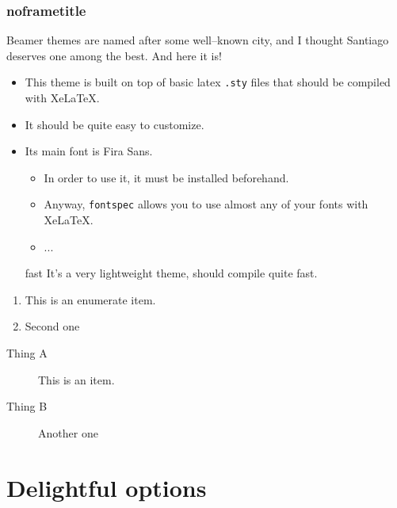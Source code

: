 \documentclass[aspectratio=169]{beamer}
\begin{document}
\begin{frame}
\frametitle{noframetitle}

Beamer themes are named after some well--known city, and I thought Santiago
deserves one among the best. And here it is!

\begin{itemize}
  \item This theme is built on top of basic latex \texttt{.sty} files that should be compiled with XeLaTeX.
  \item It should be quite easy to customize.
  \item Its main font is Fira Sans.
  \begin{itemize}
    \item In order to use it, it must be installed beforehand.
    \item Anyway, \texttt{fontspec} allows you to use almost any of your fonts with XeLaTeX.
    \item ...
  \end{itemize}
  \item[fast] It's a very lightweight theme, should compile quite fast.
\end{itemize}



\begin{enumerate}
  \item This is an enumerate item.
  \item Second one
\end{enumerate}

\begin{description}
  \item[Thing A] This is an item.
  \item[Thing B] Another one
\end{description}

\end{frame}





\section{Delightful options}
\end{document}
